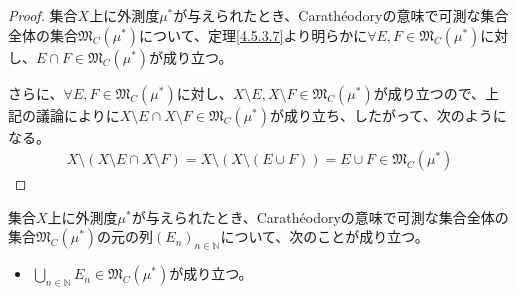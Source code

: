 \documentclass[dvipdfmx]{jsarticle}
\begin{document}
\begin{proof}
集合$X$上に外測度$\mu^{*}$が与えられたとき、Carathéodoryの意味で可測な集合全体の集合$\mathfrak{M}_{C}\left( \mu^{*} \right)$について、定理\ref{4.5.3.7}より明らかに$\forall E,F \in \mathfrak{M}_{C}\left( \mu^{*} \right)$に対し、$E \cap F \in \mathfrak{M}_{C}\left( \mu^{*} \right)$が成り立つ。\par
さらに、$\forall E,F \in \mathfrak{M}_{C}\left( \mu^{*} \right)$に対し、$X \setminus E,X \setminus F \in \mathfrak{M}_{C}\left( \mu^{*} \right)$が成り立つので、上記の議論によりに$X \setminus E \cap X \setminus F \in \mathfrak{M}_{C}\left( \mu^{*} \right)$が成り立ち、したがって、次のようになる。
\begin{align*}
X \setminus (X \setminus E \cap X \setminus F) = X \setminus \left( X \setminus (E \cup F) \right) = E \cup F \in \mathfrak{M}_{C}\left( \mu^{*} \right)
\end{align*}
\end{proof}
\begin{thm}\label{4.5.3.9}
集合$X$上に外測度$\mu^{*}$が与えられたとき、Carathéodoryの意味で可測な集合全体の集合$\mathfrak{M}_{C}\left( \mu^{*} \right)$の元の列$\left( E_{n} \right)_{n \in \mathbb{N}}$について、次のことが成り立つ。
\begin{itemize}
\item
  $\bigcup_{n \in \mathbb{N}} E_{n} \in \mathfrak{M}_{C}\left( \mu^{*} \right)$が成り立つ。
\end{itemize}
\end{thm}
\end{document}
